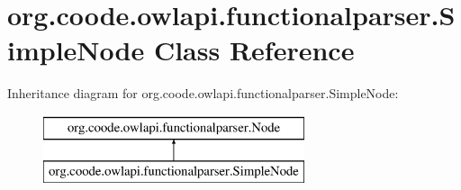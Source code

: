 \hypertarget{classorg_1_1coode_1_1owlapi_1_1functionalparser_1_1_simple_node}{\section{org.\-coode.\-owlapi.\-functionalparser.\-Simple\-Node Class Reference}
\label{classorg_1_1coode_1_1owlapi_1_1functionalparser_1_1_simple_node}
}
Inheritance diagram for org.\-coode.\-owlapi.\-functionalparser.\-Simple\-Node\-:\begin{figure}[H]
\begin{center}
\leavevmode
\includegraphics[height=2.000000cm]{classorg_1_1coode_1_1owlapi_1_1functionalparser_1_1_simple_node}
\end{center}
\end{figure}
